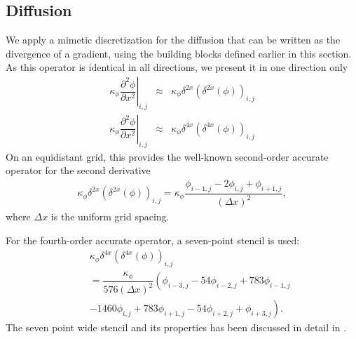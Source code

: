 \documentclass[gmd]{copernicus}
\begin{document}
\subsection{Diffusion}
We apply a mimetic discretization for the diffusion that can be written as the divergence of a gradient, using the building blocks defined earlier in this section. As this operator is identical in all directions, we present it in one direction only
\begin{eqnarray}
\left. \kappa_\phi \dfrac{\partial^2 \phi}{\partial x^2}\right|_{i,j} & \approx &
\kappa_\phi \delta^{2x} \left( \delta^{2x} \left( \phi \right) \right)_{i,j}\\
\left. \kappa_\phi \dfrac{\partial^2 \phi}{\partial x^2}\right|_{i,j} & \approx &
\kappa_\phi \delta^{4x} \left( \delta^{4x} \left( \phi \right) \right)_{i,j}
\end{eqnarray}
On an equidistant grid, this provides the well-known second-order accurate operator for the second derivative
\begin{eqnarray}
\kappa_\phi \delta^{2x} \left( \delta^{2x} \left( \phi \right) \right)_{i,j} =
\kappa_\phi \dfrac{ \phi_{i-1,j} - 2 \phi_{i,j} + \phi_{i+1,j} }{\left( \Delta x \right)^2},
\end{eqnarray}
where $\Delta x$ is the uniform grid spacing.

For the fourth-order accurate operator, a seven-point stencil is used:
\begin{eqnarray}
\nonumber
&& \kappa_\phi \delta^{4x} \left( \delta^{4x} \left( \phi \right) \right)_{i,j}\\
\nonumber
&& = \dfrac{\kappa_\phi}{576 \left( \Delta x \right)^2} \left( \phi_{i-3,j} - 54 \phi_{i-2,j} + 783 \phi_{i-1,j}\right.\\
&&  \left. - 1460  \phi_{i,j} + 783 \phi_{i+1,j} - 54 \phi_{i+2,j} + \phi_{i+3,j} \right).
\end{eqnarray}
The seven point wide stencil and its properties has been discussed in detail in \citet{Castillo1995}.
\end{document}
